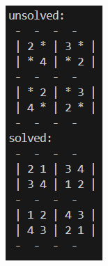 \documentclass[]{final_report}
\begin{document}
\begin{figure}[ht]
\begin{minipage}{0.3\textwidth}
        \includegraphics[width=\textwidth]{images/terminal 2x2.png} 

\end{minipage}
\end{figure}
\end{document}
